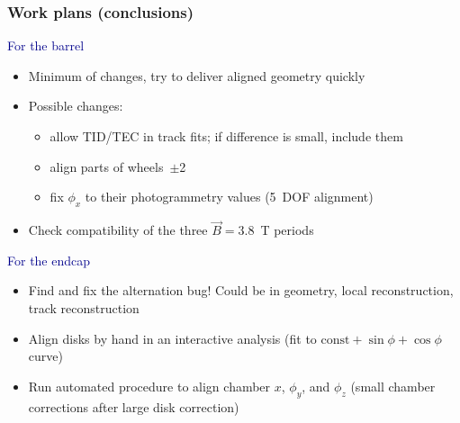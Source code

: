 \documentclass[compress]{beamer}
\begin{document}
\begin{frame}
\frametitle{Work plans (conclusions)}

\textcolor{darkblue}{\large For the barrel}
\begin{itemize}
\item Minimum of changes, try to deliver aligned geometry quickly
\item Possible changes:
\begin{itemize}
\item allow TID/TEC in track fits; if difference is small, include
  them
\item align parts of wheels~$\pm$2
\item fix $\phi_x$ to their photogrammetry values (5~DOF alignment)
\end{itemize}
\item Check compatibility of the three $\vec{B} = 3.8$~T periods
\end{itemize}

\vfill
\textcolor{darkblue}{\large For the endcap}
\begin{itemize}
\item Find and fix the alternation bug!  Could be in geometry, local
  reconstruction, track reconstruction
\item Align disks by hand in an interactive analysis (fit to
  $\mbox{const} + \sin\phi + \cos\phi$ curve)
\item Run automated procedure to align chamber $x$, $\phi_y$, and
  $\phi_z$ (small chamber corrections after large disk correction)
\end{itemize}
\label{numpages}
\end{frame}

\end{document}
